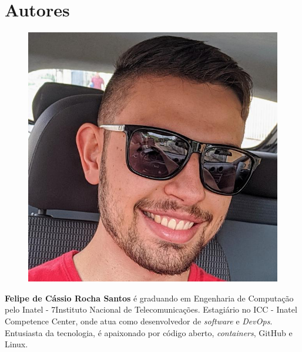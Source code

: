 \section*{Autores}

\begin{figure}
\includegraphics[width=\linewidth]{figuras/autor_felipe.jpg}
\end{figure}

\textbf{Felipe de Cássio Rocha Santos} é graduando em Engenharia de Computação pelo Inatel - 7Instituto Nacional de Telecomunicações. Estagiário no ICC - Inatel Competence Center, onde atua como desenvolvedor de \textit{software} e \textit{DevOps}. Entusiasta da tecnologia, é apaixonado por código aberto, \textit{containers}, GitHub e Linux.\newline

